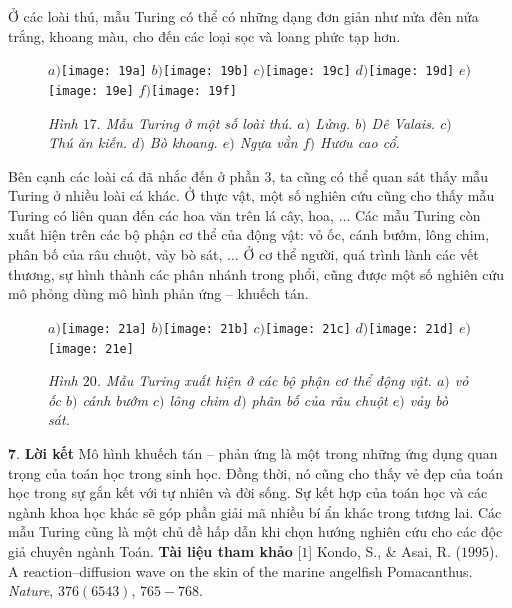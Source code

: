 \begin{multicols}{2}
	\vskip 0.05cm
	Ở các loài thú, mẫu Turing có thể có những dạng đơn giản như nửa đên nửa trắng, khoang màu, cho đến các loại sọc và loang phức tạp hơn.
	\begin{figure}[H]
		\vspace*{-5pt}
		\centering
		\captionsetup{labelformat= empty, justification=centering}
		$a)$\texttt{[image: 19a]}
		$b)$\texttt{[image: 19b]}
		$c)$\texttt{[image: 19c]}
		$d)$\texttt{[image: 19d]}
		$e)$\texttt{[image: 19e]}
		$f)$\texttt{[image: 19f]}
		\caption{\small\textit{\color{timhieukhoahoc}Hình $17.$ Mẫu Turing ở một số loài thú. $a)$ Lửng. $b)$ Dê Valais. $c)$ Thú ăn kiến. $d)$ Bò khoang. $e)$ Ngựa vằn $f)$ Hươu cao cổ.}}
		\vspace*{-10pt}
	\end{figure}  
	Bên cạnh các loài cá đã nhắc đến ở phần $3$, ta cũng có thể quan sát thấy mẫu Turing ở nhiều loài cá khác. Ở thực vật, một số nghiên cứu cũng cho thấy mẫu Turing có liên quan đến các hoa văn trên lá cây, hoa, ... 
	\vskip 0.05cm
	Các mẫu Turing còn xuất hiện trên các bộ phận cơ thể của động vật: vỏ ốc, cánh bướm, lông chim, phân bố của râu chuột, vảy bò sát, ... Ở cơ thể người, quá trình lành các vết thương, sự hình thành các phân nhánh trong phổi,  cũng được một số nghiên cứu mô phỏng dùng mô hình phản ứng -- khuếch tán.
	\begin{figure}[H]
		\vspace*{-5pt}
		\centering
		\captionsetup{labelformat= empty, justification=centering}
		$a)$\texttt{[image: 21a]}
		$b)$\texttt{[image: 21b]}
		$c)$\texttt{[image: 21c]}
		$d)$\texttt{[image: 21d]}
		$e)$\texttt{[image: 21e]}
		\caption{\small\textit{\color{timhieukhoahoc}Hình $20$. Mẫu Turing xuất hiện ở các bộ phận cơ thể động vật. $a)$ vỏ ốc $b)$ cánh bướm $c)$ lông chim $d)$ phân bố của râu chuột $e)$ vảy bò sát.}}
		\vspace*{-10pt}
	\end{figure}  
	$\pmb{7.}$ \textbf{\color{timhieukhoahoc}Lời kết}
	\vskip 0.05cm
	Mô hình khuếch tán -- phản ứng là một trong những ứng dụng quan trọng của toán học trong sinh học. Đồng thời, nó cũng cho thấy vẻ đẹp của toán học trong sự gắn kết với tự nhiên và đời sống. Sự kết hợp của toán học và các ngành khoa học khác sẽ góp phần giải mã nhiều bí ẩn khác trong tương lai. Các mẫu Turing cũng là một chủ đề hấp dẫn khi chọn hướng nghiên cứu cho các độc giả chuyên ngành Toán.
	\vskip 0.05cm
	\textbf{\color{timhieukhoahoc}Tài liệu tham khảo}
	\vskip 0.05cm
	[$1$] Kondo, S., \& Asai, R. ($1995$). A reaction--diffusion wave on the skin of the marine angelfish Pomacanthus. \textit{Nature}, $376(6543)$, $765-768$.

\end{multicols}
